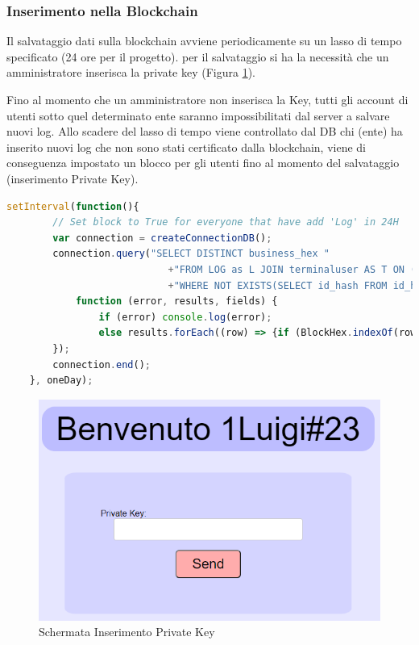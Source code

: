 \documentclass[11pt,a4paper,titlepage]{report}
\begin{document}
\subsubsection{Inserimento nella Blockchain}
Il salvataggio dati sulla blockchain avviene periodicamente su un lasso di tempo specificato (24 ore per il progetto).
per il salvataggio si ha la necessità che un amministratore inserisca la private key (Figura \ref{fig:Input_Key}).

Fino al momento che un amministratore non inserisca la Key, tutti gli account di utenti sotto quel determinato ente saranno impossibilitati dal server a salvare nuovi log. Allo scadere del lasso di tempo viene controllato dal DB chi (ente) ha inserito nuovi log che non sono stati certificato dalla blockchain, viene di conseguenza impostato un blocco per gli utenti fino al momento del salvataggio (inserimento Private Key).

\begin{lstlisting}[language=JavaScript]
	setInterval(function(){
		// Set block to True for everyone that have add 'Log' in 24H
		var connection = createConnectionDB();
		connection.query("SELECT DISTINCT business_hex "
							+"FROM LOG as L JOIN terminaluser AS T ON (L.UserName= T.UserName) JOIN id_hash AS H ON(T.Business_Hex= H.Business)"
							+"WHERE NOT EXISTS(SELECT id_hash FROM id_hash WHERE id_hash= L.ID_HASH)",
		  	function (error, results, fields) {
		  		if (error) console.log(error);
		  		else results.forEach((row) => {if (BlockHex.indexOf(row.business_hex)===-1) BlockHex.push(row.business_hex);});
		});
		connection.end();
	}, oneDay);
\end{lstlisting}

\begin{figure}[h]
	\includegraphics[width=\textwidth]{Input_Key}
	\centering
	\caption{Schermata Inserimento Private Key}
	\label{fig:Input_Key}
\end{figure}
\end{document}
